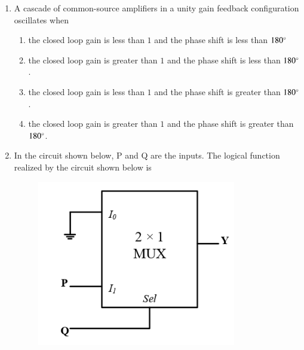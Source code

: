 \documentclass[a4paper, 11pt]{article}
\begin{document}
\begin{enumerate}
    \hfill{}
    
    \item A cascade of common-source amplifiers in a unity gain feedback configuration oscillates when
    \begin{enumerate}
        \item the closed loop gain is less than $1$ and the phase shift is less than $180\degree$
        \item the closed loop gain is greater than $1$ and the phase shift is less than $180\degree$.
        \item the closed loop gain is less than $1$ and the phase shift is greater than $180\degree$.
        \item the closed loop gain is greater than $1$ and the phase shift is greater than $180\degree$.
    \end{enumerate}

    \hfill{}
    
    \item In the circuit shown below, P and Q are the inputs. The logical function realized by the circuit shown below is
    \begin{figure}[H]
        \centering
        \includegraphics[width=0.3\columnwidth]{figs/Q13.png}
        \caption*{}
        \label{fig:q23}
    \end{figure}
    \begin{enumerate}
    \end{enumerate}

    \hfill{}
    

\end{enumerate}
\end{document}
